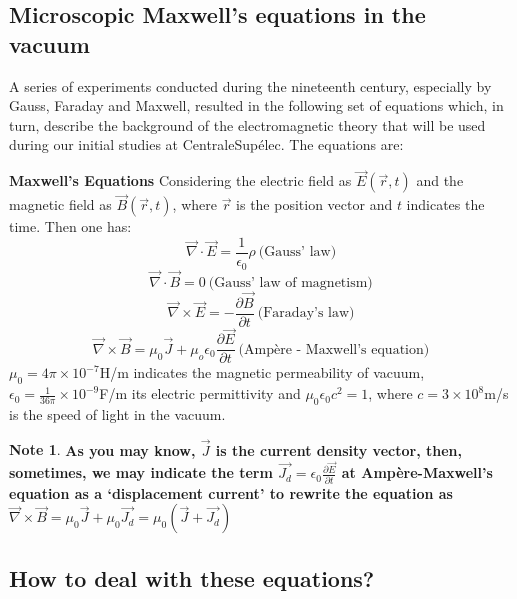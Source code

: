 \documentclass[11pt]{article}
\theoremstyle{definition}
\newtheorem{note}{Note}
\begin{document}
\subsection{Microscopic Maxwell's equations in the vacuum}
A series of experiments conducted during the nineteenth century, especially by Gauss, Faraday and Maxwell, resulted in the following set of equations which,
in turn, describe the background of the electromagnetic theory that will be used during our initial studies at CentraleSupélec. The equations are:
\begin{shaded}
    \textbf{Maxwell's Equations}\newline
    Considering the electric field as $\vec{E}\left(\vec{r},t\right)$ and the magnetic field as $\vec{B}\left(\vec{r},t\right)$, where $\vec{r}$ is the position vector and $t$ indicates the time. Then one has:
    \begin{equation}
    \vec{\nabla} \cdot \vec{E} = \frac{1}{\epsilon_0}\rho \ \text{(Gauss' law)}
    \end{equation}
    \begin{equation}
        \vec{\nabla} \cdot \vec{B} = 0 \ \text{(Gauss' law of magnetism)}
    \end{equation}
    \begin{equation}
        \vec{\nabla} \times \vec{E} = -\frac{\partial \vec{B}}{\partial t} \ \text{(Faraday's law)}
    \end{equation}
    \begin{equation}
        \vec{\nabla} \times \vec{B} = \mu_0 \vec{J} + \mu_o \epsilon_0 \frac{\partial \vec{E}}{\partial t} \ \text{(Ampère - Maxwell's equation)}
    \end{equation}
$\mu_0 = 4\pi \times 10^{-7}$H/m indicates the magnetic permeability of vacuum, $\epsilon_0 = \frac{1}{36\pi}\times 10^{-9}$F/m its electric permittivity and $\mu_0 \epsilon_0 c^2 = 1$, where $c = 3 \times 10^{8}$m/s is the speed of light in the vacuum.
\begin{note}
    \textbf{As you may know, $\vec{J}$ is the current density vector, then, sometimes, we may indicate the term $\vec{J_{d}} = \epsilon_0 \frac{\partial \vec{E}}{\partial t}$ at Ampère-Maxwell's equation as a `displacement current' to rewrite the equation as
    $\vec{\nabla} \times \vec{B} = \mu_0 \vec{J} + \mu_0 \vec{J_{d}} = \mu_0 \left(\vec{J} + \vec{J_{d}}\right)$}
\end{note}
\end{shaded}

\subsection{How to deal with these equations?}
\end{document}
